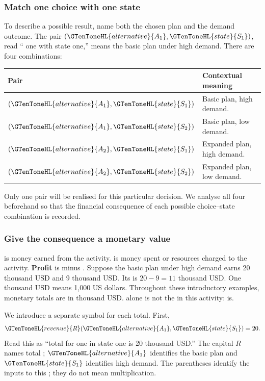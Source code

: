 \subsubsection*{Match one choice with one state}
To describe a possible result, name both the chosen plan and the demand
outcome. The pair \((\GTenToneHL{alternative}{A_1},\GTenToneHL{state}{S_1})\), read `` one with state one,''
means the basic plan under high demand. There are four combinations:
\begin{center}
\begin{tabular}{@{}ll@{}}
\toprule Pair & Contextual meaning \\ \midrule
\((\GTenToneHL{alternative}{A_1},\GTenToneHL{state}{S_1})\) & Basic plan, high demand. \\
\((\GTenToneHL{alternative}{A_1},\GTenToneHL{state}{S_2})\) & Basic plan, low demand. \\
\((\GTenToneHL{alternative}{A_2},\GTenToneHL{state}{S_1})\) & Expanded plan, high demand. \\
\((\GTenToneHL{alternative}{A_2},\GTenToneHL{state}{S_2})\) & Expanded plan, low demand. \\
\bottomrule
\end{tabular}
\end{center}
Only one pair will be realised for this particular decision. We analyse all
four beforehand so that the financial consequence of each possible
choice--state combination is recorded.

\subsubsection*{Give the consequence a monetary value}
\textbf{} is money earned from the activity. \textbf{} is money
spent or resources charged to the activity. \textbf{Profit} is  minus
. Suppose the basic plan under high demand earns 20 thousand USD and
 9 thousand USD. Its  is \(20-9=11\) thousand USD.
One thousand USD means 1,000 US dollars. Throughout these introductory
examples, monetary totals are in thousand USD.  alone is not the
 in this activity:  is.

We introduce a separate symbol for each total. First,
\[
\GTenToneHL{revenue}{R}(\GTenToneHL{alternative}{A_1},\GTenToneHL{state}{S_1})=20.
\]
Read this as ``total  for  one in state one is 20 thousand
USD.'' The capital \(R\) names total ; \(\GTenToneHL{alternative}{A_1}\) identifies the basic
plan and \(\GTenToneHL{state}{S_1}\) identifies high demand. The parentheses identify the inputs
to this ; they do not mean multiplication.

